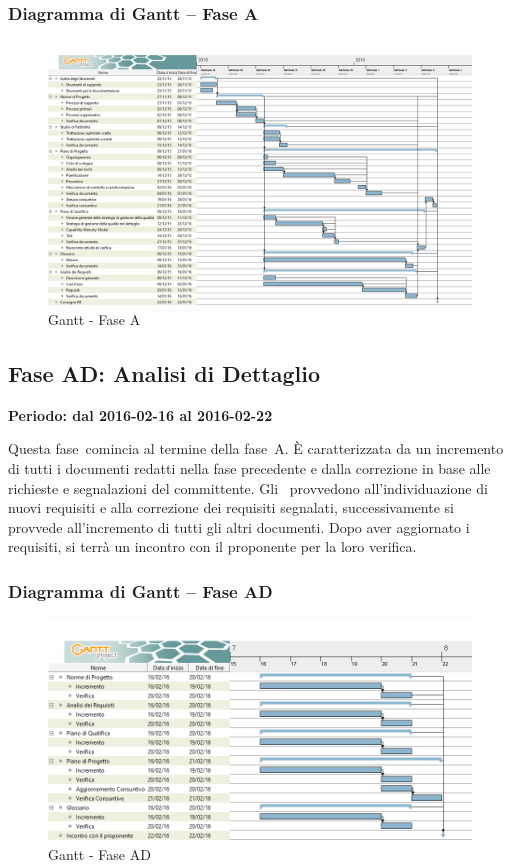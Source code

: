 \documentclass[../PianoProgetto.tex]{subfiles}
\begin{document}
		\subsubsection{Diagramma di Gantt – Fase A}
			\begin{figure}[!h]
				\centering
				\includegraphics[width=\textwidth]{gantt_png/1-analisi}
				\caption{Gantt - Fase A}
				\label{fig:Gantt - Fase A}
			\end{figure}			
	
	\subsection{Fase AD: Analisi di Dettaglio}
		\textbf{Periodo: dal 2016-02-16 al 2016-02-22}

				Questa fase\g\ comincia al termine della fase\g\ A. È caratterizzata da un incremento di tutti i documenti redatti nella fase precedente e dalla correzione in base alle richieste e segnalazioni del committente. Gli \analisti\ provvedono all'individuazione di nuovi requisiti e alla correzione dei requisiti segnalati, successivamente si provvede all'incremento di tutti gli altri documenti. Dopo aver aggiornato i requisiti, si terrà un incontro con il proponente per la loro verifica.
		\newpage			
		\subsubsection{Diagramma di Gantt – Fase AD}
			\begin{figure}[!h]
				\centering
				\includegraphics[width=\textwidth]{gantt_png/2-analisi_di_dettaglio}
				\caption{Gantt - Fase AD}
				\label{fig:Gantt - Fase AD}
			\end{figure}
\end{document}
